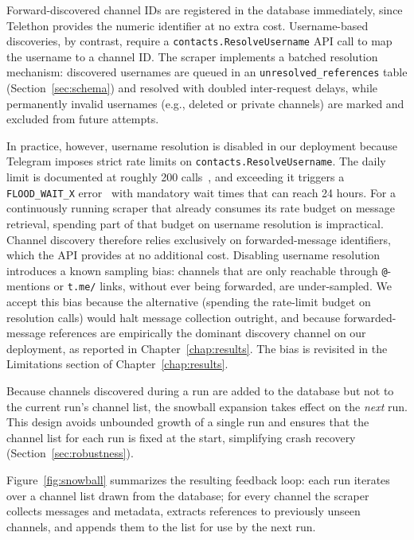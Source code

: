 Forward-discovered channel IDs are registered in the database immediately, since Telethon provides the numeric identifier at no extra cost.
Username-based discoveries, by contrast, require a \texttt{contacts.ResolveUsername} API call to map the username to a channel ID.
The scraper implements a batched resolution mechanism: discovered usernames are queued in an \texttt{unresolved\_references} table (Section~\ref{sec:schema}) and resolved with doubled inter-request delays, while permanently invalid usernames (e.g., deleted or private channels) are marked and excluded from future attempts.

In practice, however, username resolution is disabled in our deployment because Telegram imposes strict rate limits on \texttt{contacts.ResolveUsername}.
The daily limit is documented at roughly 200 calls~\cite{tginfolimits}, and exceeding it triggers a \texttt{FLOOD\_WAIT\_X} error~\cite{telegramapierrors} with mandatory wait times that can reach 24 hours.
For a continuously running scraper that already consumes its rate budget on message retrieval, spending part of that budget on username resolution is impractical.
Channel discovery therefore relies exclusively on forwarded-message identifiers, which the API provides at no additional cost.
Disabling username resolution introduces a known sampling bias: channels that are only reachable through \texttt{@}-mentions or \texttt{t.me/} links, without ever being forwarded, are under-sampled. We accept this bias because the alternative (spending the rate-limit budget on resolution calls) would halt message collection outright, and because forwarded-message references are empirically the dominant discovery channel on our deployment, as reported in Chapter~\ref{chap:results}. The bias is revisited in the Limitations section of Chapter~\ref{chap:results}.

Because channels discovered during a run are added to the database but not to the current run's channel list, the snowball expansion takes effect on the \emph{next} run.
This design avoids unbounded growth of a single run and ensures that the channel list for each run is fixed at the start, simplifying crash recovery (Section~\ref{sec:robustness}).

Figure~\ref{fig:snowball} summarizes the resulting feedback loop: each run iterates over a channel list drawn from the database; for every channel the scraper collects messages and metadata, extracts references to previously unseen channels, and appends them to the list for use by the next run.

